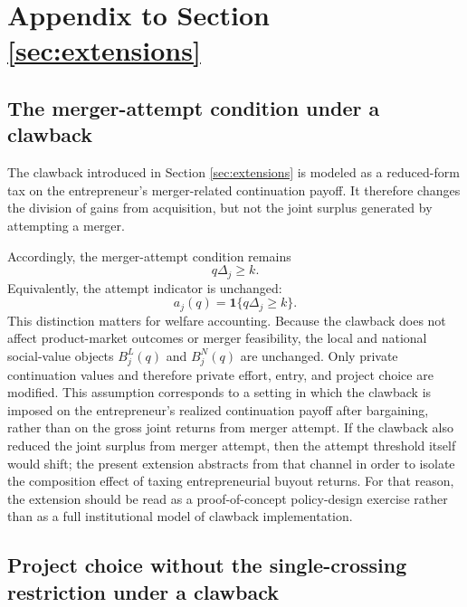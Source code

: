 \section{Appendix to Section \ref{sec:extensions}}\label{app:extensions}

\subsection{The merger-attempt condition under a clawback}

The clawback introduced in Section \ref{sec:extensions} is modeled as a reduced-form tax on the entrepreneur's merger-related continuation payoff.
It therefore changes the division of gains from acquisition, but not the joint surplus generated by attempting a merger.

Accordingly, the merger-attempt condition remains
\begin{equation}
    q\Delta_j \ge k.
\end{equation}
Equivalently, the attempt indicator is unchanged:
\begin{equation}
    a_j(q)=\mathbf{1}\{q\Delta_j \ge k\}.
\end{equation}
This distinction matters for welfare accounting.
Because the clawback does not affect product-market outcomes or merger feasibility, the local and national social-value objects \(B_j^L(q)\) and \(B_j^N(q)\) are unchanged.
Only private continuation values and therefore private effort, entry, and project choice are modified.
This assumption corresponds to a setting in which the clawback is imposed on the entrepreneur's realized continuation payoff after bargaining, rather than on the gross joint returns from merger attempt.
If the clawback also reduced the joint surplus from merger attempt, then the attempt threshold itself would shift; the present extension abstracts from that channel in order to isolate the composition effect of taxing entrepreneurial buyout returns.
For that reason, the extension should be read as a proof-of-concept policy-design exercise rather than as a full institutional model of clawback implementation.

\subsection{Project choice without the single-crossing restriction under a clawback}

